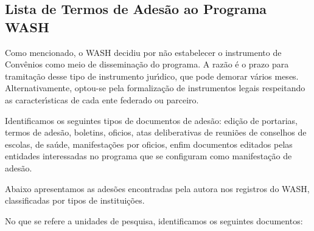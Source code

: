 \documentclass[
12pt,		%
openright,	%
twoside,  %
a4paper,			%
chapter=TITLE,		%
english,			%
french,				%
spanish,			%
brazil				%
]{USPSC-classe/USPSC}
\begin{document}
\subsection[Lista de Termos de Ades\~ao ao Programa WASH]{Lista de Termos de Ades\~ao ao Programa WASH}\label{Lista de Termos de Ades\~ao ao Programa WASH}
Como mencionado, o WASH decidiu por n\~ao estabelecer  o instrumento de Conv\^enios como meio de dissemina\c{c}\~ao do programa. A raz\~ao \'e o prazo para tramita\c{c}\~ao desse tipo de instrumento jur\'{\i}dico, que pode demorar v\'arios meses. Alternativamente, optou-se pela formaliza\c{c}\~ao  de instrumentos legais respeitando as caracter\'{\i}sticas de cada ente federado ou parceiro.

















Identificamos os seguintes tipos de documentos de ades\~ao:  edi\c{c}\~ao de portarias, termos de ades\~ao, boletins, oficios, atas deliberativas de reuni\~oes de conselhos de escolas, de sa\'ude, manifesta\c{c}\~oes por oficios, enfim   documentos editados pelas entidades interessadas no programa que se configuram como manifesta\c{c}\~ao de ades\~ao.

















Abaixo apresentamos as ades\~oes encontradas pela autora nos registros do WASH, classificadas por \textquotedbl tipos de institui\c{c}\~oes\textquotedbl .

















No que se refere a \textquotedbl unidades de pesquisa\textquotedbl , identificamos os seguintes documentos:
\end{document}
